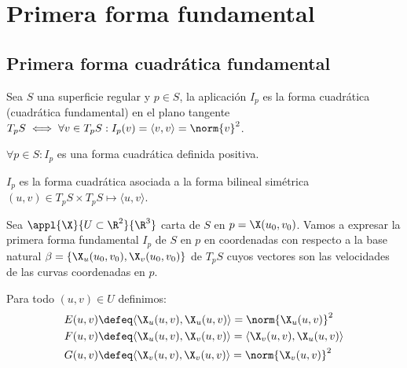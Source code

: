 \section{Primera forma fundamental}

\subsection{Primera forma cuadrática fundamental}

\begin{defn}
	Sea $S$ una superficie regular y $p\in S$, la aplicación $I_p$ es la forma cuadrática (cuadrática fundamental) en el plano tangente $T_pS \iff \forall v \in T_pS : I_p(v) = \langle v,v \rangle = \norm{v}^2$.
\end{defn}

\begin{obs}
	$\forall p \in S : I_p$ es una forma cuadrática definida positiva.

	$I_p$ es la forma cuadrática asociada a la forma bilineal simétrica $(u,v) \in T_pS \times T_pS \mapsto \langle u,v \rangle$.
\end{obs}

Sea $\appl{\X}{U\subset \R^2}{\R^3}$ carta de $S$ en $p=\X(u_0, v_0)$. Vamos a expresar la primera forma fundamental $I_p$ de $S$ en $p$ en coordenadas con respecto a la base natural $\beta = \{\X_u(u_0, v_0), \X_v(u_0, v_0)\}$ de $T_pS$ cuyos vectores son las velocidades de las curvas coordenadas en $p$.

Para todo $(u, v) \in U$ definimos:
\[\begin{aligned}
		E(u, v) & \defeq \langle \X_u(u, v), \X_u(u, v) \rangle = \norm{\X_u(u, v)}^2                    \\
		F(u, v) & \defeq \langle \X_u(u, v), \X_v(u, v) \rangle = \langle \X_v(u, v), \X_u(u, v) \rangle \\
		G(u, v) & \defeq \langle \X_v(u, v), \X_v(u, v) \rangle = \norm{\X_v(u, v)}^2
	\end{aligned}\]

